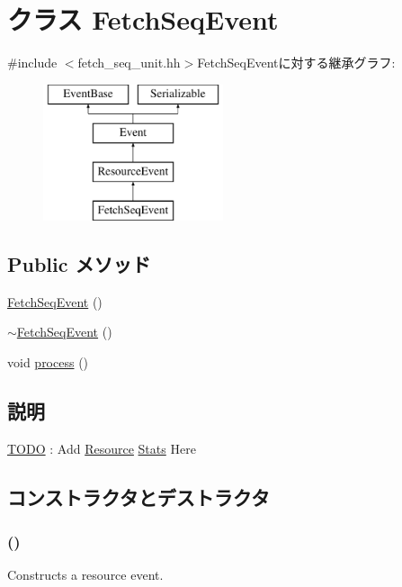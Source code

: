 \hypertarget{classFetchSeqUnit_1_1FetchSeqEvent}{
\section{クラス FetchSeqEvent}
\label{classFetchSeqUnit_1_1FetchSeqEvent}
}


{\ttfamily \#include $<$fetch\_\-seq\_\-unit.hh$>$}FetchSeqEventに対する継承グラフ:\begin{figure}[H]
\begin{center}
\leavevmode
\includegraphics[height=4cm]{classFetchSeqUnit_1_1FetchSeqEvent}
\end{center}
\end{figure}
\subsection*{Public メソッド}
\begin{DoxyCompactItemize}
\item 
\hyperlink{classFetchSeqUnit_1_1FetchSeqEvent_a71f8d6612bc981535908d0e15172dc9d}{FetchSeqEvent} ()
\item 
\hyperlink{classFetchSeqUnit_1_1FetchSeqEvent_ae83ae0731d9882cc58d04be78282ec71}{$\sim$FetchSeqEvent} ()
\item 
void \hyperlink{classFetchSeqUnit_1_1FetchSeqEvent_a2e9c5136d19b1a95fc427e0852deab5c}{process} ()
\end{DoxyCompactItemize}


\subsection{説明}
\begin{Desc}
\item[\hyperlink{todo__todo000023}{TODO}]: Add \hyperlink{classResource}{Resource} \hyperlink{namespaceStats}{Stats} Here \end{Desc}


\subsection{コンストラクタとデストラクタ}
\hypertarget{classFetchSeqUnit_1_1FetchSeqEvent_a71f8d6612bc981535908d0e15172dc9d}{
\subsubsection[{FetchSeqEvent}]{ ()}}
\label{classFetchSeqUnit_1_1FetchSeqEvent_a71f8d6612bc981535908d0e15172dc9d}
Constructs a resource event. 


